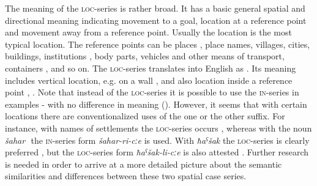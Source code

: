 The meaning of the \textsc{loc}-series is rather broad. It has a basic general spatial and directional meaning indicating movement to a goal, location at a reference point and movement away from a reference point. Usually the location is the most typical location. The reference points can be places , place names, villages, cities, buildings, institutions , body parts, vehicles and other means of transport, containers , and so on. The \textsc{loc-}series translates into English as . Its meaning includes vertical location, e.g. on a wall , and also location inside a reference point , . Note that instead of the \textsc{loc}-series it is possible to use the  \textsc{in}-series in examples - with no difference in meaning (). However, it seems that with certain locations there are conventionalized uses of the one or the other suffix. For instance, with names of settlements the \textsc{loc}-series occurs , whereas with the noun \textit{šahar} ‎‎ the \textsc{in}-series form \textit{šahar-ri-cːe} is used. With \textit{ħaˁšak}  the \textsc{loc}-series is clearly preferred , but the \textsc{loc}-series form \textit{ħaˁšak-li-cːe} is also attested . Further research is needed in order to arrive at a more detailed picture about the semantic similarities and differences between these two spatial case series.

